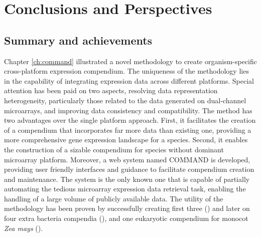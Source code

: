 \chapter{Conclusions and Perspectives}\label{ch:conclusion}

\instructionsconclusions



\section{Summary and achievements}

Chapter \ref{ch:command} illustrated a novel methodology to create 
organism-specific cross-platform expression compendium.  
%
The uniqueness of the methodology lies in the capability of integrating
expression data across different platforms.
%
Special attention has been paid on two aspects, resolving data representation
heterogeneity, particularly those related to the data generated on dual-channel
microarrays, and improving data consistency and compatibility.
%
The method has two advantages over the single platform approach.  First, it
facilitates the creation of a compendium that incorporates far more data than
existing one, providing a more comprehensive gene expression landscape for a
species.  Second, it enables the construction of a sizable compendium for
species without dominant microarray platform.
%
Moreover, a web system named COMMAND is developed, providing user friendly
interfaces and guidance to facilitate compendium creation and maintenance.
%
The system is the only known one that is capable of partially automating the
tedious microarray expression data retrieval task, enabling the handling of a
large volume of publicly available data.
%
The utility of the methodology has been proven by successfully creating first
three (\cite{Engelen2011}) and later on four extra bacteria compendia
(\cite{Meysman2014}), and one eukaryotic compendium for monocot \textit{Zea
  mays} (\cite{Fu2014}).



